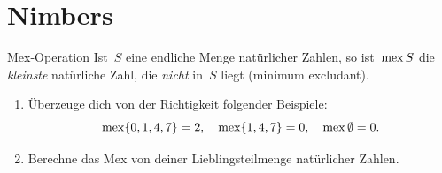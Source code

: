 \documentclass{../zirkelblatt}
\newcommand{\head}[1]{\section*{\rmfamily #1}}%
\begin{document}
%


\head{Nimbers}

\begin{aufgabe}{Mex-Operation}
\label{mex}
Ist~$S$ eine endliche Menge natürlicher Zahlen, so ist~$\operatorname{mex} S$ die \emph{kleinste}
natürliche Zahl, die \emph{nicht} in~$S$ liegt (minimum excludant).
\begin{enumerate}
\item Überzeuge dich von der Richtigkeit folgender Beispiele:
\[
  \operatorname{mex} \{ 0,1,4,7 \} = 2, \quad
  \operatorname{mex} \{ 1,4,7 \} = 0, \quad
  \operatorname{mex} \emptyset = 0. \]
\item Berechne das Mex von deiner Lieblingsteilmenge natürlicher Zahlen.
\end{enumerate}
\end{aufgabe}
\end{document}
